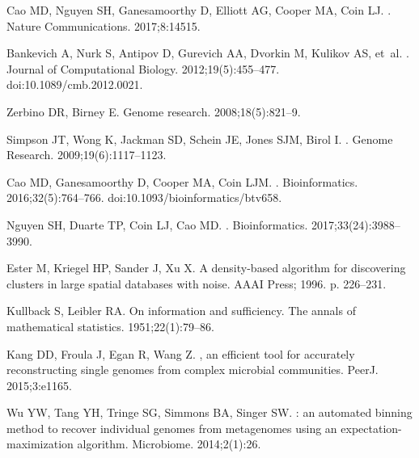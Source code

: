 \documentclass[10pt,letterpaper]{article}
\begin{document}
\begin{thebibliography}{10}

Cao MD, Nguyen SH, Ganesamoorthy D, Elliott AG, Cooper MA, Coin LJ.
.
\newblock Nature Communications. 2017;8:14515.

Bankevich A, Nurk S, Antipov D, Gurevich AA, Dvorkin M, Kulikov AS, et~al.
.
\newblock Journal of Computational Biology. 2012;19(5):455--477.
\newblock doi:{10.1089/cmb.2012.0021}.

Zerbino DR, Birney E.
\newblock Genome research. 2008;18(5):821--9.

Simpson JT, Wong K, Jackman SD, Schein JE, Jones SJM, Birol I.
.
\newblock Genome Research. 2009;19(6):1117--1123.

Cao MD, Ganesamoorthy D, Cooper MA, Coin LJM.
.
\newblock Bioinformatics. 2016;32(5):764--766.
\newblock doi:{10.1093/bioinformatics/btv658}.

Nguyen SH, Duarte TP, Coin LJ, Cao MD.
.
\newblock Bioinformatics. 2017;33(24):3988--3990.

Ester M, Kriegel HP, Sander J, Xu X.
\newblock A density-based algorithm for discovering clusters in large spatial
  databases with noise.
\newblock AAAI Press; 1996. p. 226--231.

Kullback S, Leibler RA.
\newblock On information and sufficiency.
\newblock The annals of mathematical statistics. 1951;22(1):79--86.

Kang DD, Froula J, Egan R, Wang Z.
, an efficient tool for accurately reconstructing single
  genomes from complex microbial communities.
\newblock PeerJ. 2015;3:e1165.

Wu YW, Tang YH, Tringe SG, Simmons BA, Singer SW.
: an automated binning method to recover individual genomes
  from metagenomes using an expectation-maximization algorithm.
\newblock Microbiome. 2014;2(1):26.


\end{thebibliography}
\end{document}

